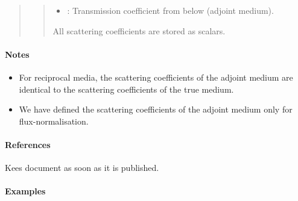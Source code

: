 \documentclass[letterpaper,10pt,english]{sphinxmanual}
\begin{document}
\begin{fulllineitems}
\begin{fulllineitems}
\begin{quote}
\begin{description}
\begin{quote}
\begin{description}
\begin{itemize}
\item {} 
: Transmission coefficient from below (adjoint medium).

\end{itemize}

\end{description}

All scattering coefficients are stored as scalars.
\end{quote}

\end{description}\end{quote}
\paragraph{Notes}
\begin{itemize}
\item {} 
For reciprocal media, the scattering coefficients of the adjoint medium are identical to the scattering coefficients of the true medium.

\item {} 
We have defined the scattering coefficients of the adjoint medium only for flux-normalisation.

\end{itemize}
\paragraph{References}

Kees document as soon as it is published.
\paragraph{Examples}

%
\begin{sphinxVerbatim}[commandchars=\\\{\}]
     
   
\end{sphinxVerbatim}


\end{fulllineitems}
\end{fulllineitems}
\end{document}
